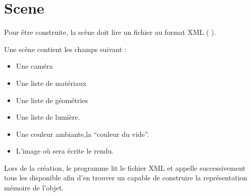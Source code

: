\section{Scene}
Pour être construite, la scène doit lire un fichier au format XML (\cf
{}).

Une scène contient les champs suivant :
\begin{itemize}
  \item Une caméra
  \item Une liste de matériaux
  \item Une liste de géométries
  \item Une liste de lumière.
  \item Une couleur ambiante,\ie la ``couleur du vide''.
  \item L'image où sera écrite le rendu.
\end{itemize}

Lors de la création, le programme lit le fichier XML et appelle successivement
tous les  disponible afin d'en trouver un capable de construire
la représentation mémoire de l'objet.

